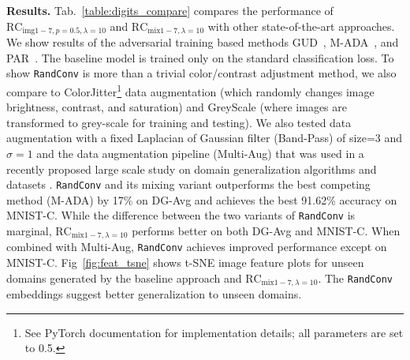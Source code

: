 \documentclass{article} \usepackage{iclr2021_conference,times}
\newcommand{\RandConv}{\texttt{RandConv}}
\begin{document}
\textbf{Results.} Tab.~\ref{table:digits_compare} compares the performance of $\text{RC}_{\text{img}1-7,p=0.5,\lambda=10}$ and $\text{RC}_{\text{mix}1-7,\lambda=10}$ with other state-of-the-art approaches. We show results of the adversarial training based methods GUD~\citep{volpi2018generalizing}, M-ADA~\citep{qiao2020learning}, and PAR~\citep{wang2019learning}. The baseline model is trained only on the standard classification loss. 
To show {\RandConv} is more than a trivial color/contrast adjustment method, we also compare to ColorJitter\footnote{See PyTorch documentation for implementation details; all parameters are set to 0.5.} data augmentation (which randomly changes image brightness, contrast, and saturation) and GreyScale (where images are transformed to grey-scale for training and testing). {We also tested data augmentation with a fixed Laplacian of Gaussian filter (Band-Pass) of size=3 and $\sigma=1$ and the data augmentation pipeline (Multi-Aug) that was used in a recently proposed large scale study on domain generalization algorithms and datasets \citep{gulrajani2020search}. } {\RandConv} and its mixing variant outperforms the best competing method (M-ADA) by 17\% on DG-Avg and achieves the best 91.62\% accuracy on MNIST-C. While the difference between the two variants of {\RandConv} is marginal, $\text{RC}_{\text{mix}1-7,\lambda=10}$ performs better on both DG-Avg and MNIST-C. {When combined with Multi-Aug, {\RandConv} achieves improved performance except on MNIST-C.}
Fig~\ref{fig:feat_tsne} shows t-SNE image feature plots for unseen domains generated by the baseline approach and $\text{RC}_{\text{mix}1-7,\lambda=10}$. The {\RandConv} embeddings suggest better generalization to unseen domains.
\end{document}
